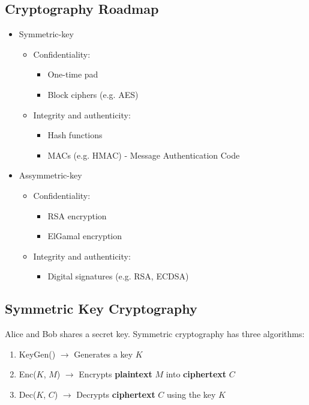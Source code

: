 \documentclass[12pt,a4paper]{article}
\begin{document}
\subsection{Cryptography Roadmap}
\begin{itemize}
    \item Symmetric-key
    \begin{itemize}
        \item Confidentiality:
        \begin{itemize}
            \item One-time pad
            \item Block ciphers (e.g. AES)
        \end{itemize}
        \item Integrity and authenticity:
        \begin{itemize}
            \item Hash functions
            \item MACs (e.g. HMAC) - Message Authentication Code
        \end{itemize}
    \end{itemize}
        \item Assymmetric-key
        \begin{itemize}
            \item Confidentiality:
            \begin{itemize}
                \item RSA encryption
                \item ElGamal encryption
            \end{itemize}
            \item Integrity and authenticity:
            \begin{itemize}
                \item Digital signatures (e.g. RSA, ECDSA)
            \end{itemize}
    \end{itemize}
\end{itemize}

\subsection{Symmetric Key Cryptography}
Alice and Bob shares a secret key. Symmetric cryptography has three algorithms:
\begin{enumerate}
    \item KeyGen() $\rightarrow$ Generates a key $K$
    \item Enc($K$, $M$) $\rightarrow$ Encrypts \textbf{plaintext} $M$ into \textbf{ciphertext} $C$
    \item Dec($K$, $C$) $\rightarrow$ Decrypts \textbf{ciphertext} $C$ using the key $K$
\end{enumerate}
\end{document}
